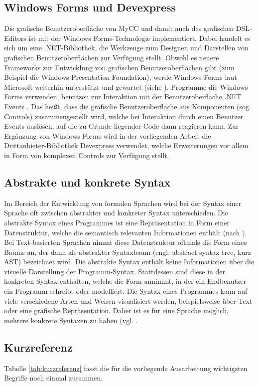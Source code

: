 \subsection{Windows Forms und Devexpress}
Die grafische Benutzeroberfläche von MyCC und damit auch des grafischen DSL-Editors ist mit der Windows Forms-Technologie implementiert. Dabei handelt es sich um eine .NET-Bibliothek, die Werkzeuge zum Designen und Darstellen von grafischen Benutzeroberflächen zur Verfügung stellt. Obwohl es neuere Frameworks zur Entwicklung von grafischen Benutzeroberflächen gibt (zum Beispiel die Windows Presentation Foundation), werde Windows Forms laut Microsoft weiterhin unterstützt und gewartet (siehe \cite{Allen:14}). Programme die Windows Forms verwenden, benutzen zur Interaktion mit der Benutzeroberfläche .NET Events \cite[S. 171ff]{Platt:03}. Das heißt, dass die grafische Benutzeroberfläche aus Komponenten (sog. Controls) zusammengestellt wird, welche bei Interaktion durch einen Benutzer Events auslösen, auf die zu Grunde liegender Code dann reagieren kann. Zur Ergänzung von Windows Forms wird in der vorliegenden Arbeit die Drittanbieter-Bibliothek Devexpress verwendet, welche Erweiterungen vor allem in Form von komplexen Controls zur Verfügung stellt. 

\subsection{Abstrakte und konkrete Syntax}
Im Bereich der Entwicklung von formalen Sprachen wird bei der Syntax einer Sprache oft zwischen abstrakter und konkreter Syntax unterschieden. Die abstrakte Syntax eines Programmes ist eine Repräsentation in Form einer Datenstruktur, welche die semantisch relevanten Informationen enthält (nach \cite[S. 26]{Voelter:13}). Bei Text-basierten Sprachen nimmt diese Datenstruktur oftmals die Form eines Baums an, der dann als abstrakter Syntaxbaum (engl. abstract syntax tree, kurz AST) bezeichnet wird. Die abstrakte Syntax enthält keine Informationen über die visuelle Darstellung der Programm-Syntax. Stattdessen sind diese in der konkreten Syntax enthalten, welche die Form annimmt, in der ein Endbenutzer ein Programm schreibt oder modelliert. Die Syntax eines Programmes kann auf viele verschiedene Arten und Weisen visualisiert werden, beispielsweise über Text oder eine grafische Repräsentation. Daher ist es für eine Sprache möglich, mehrere konkrete Syntaxen zu haben (vgl. \cite[S. 6f]{Kleppe:09}.

\subsection{Kurzreferenz}
Tabelle \ref{tab:kurzreferenz} fasst die für die vorliegende Ausarbeitung wichtigsten Begriffe noch einmal zusammen.

